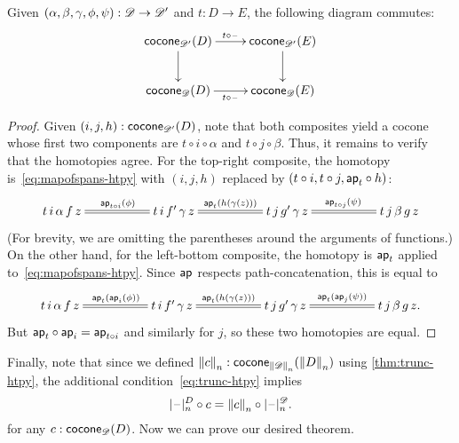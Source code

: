 \begin{lem}\label{thm:conemap-funct}
  Given $(\alpha,\beta,\gamma,\phi,\psi):\Ddiag \to \Ddiag'$ and $t:D\to E$, the following diagram commutes:
  \begin{equation*}
    \vcenter{\xymatrix{
        \cocone{\Ddiag'}{D}\ar[r]^{t \circ {\blank}}\ar[d] &
        \cocone{\Ddiag'}{E}\ar[d]\\
        \cocone{\Ddiag}{D}\ar[r]_{t \circ {\blank}} &
        \cocone{\Ddiag}{E}
      }}
  \end{equation*}
\end{lem}
\begin{proof}
  Given $(i,j,h):\cocone{\Ddiag'}{D}$, note that both composites yield a cocone whose first two components are $t\circ i\circ \alpha$ and $t\circ j\circ\beta$.
  Thus, it remains to verify that the homotopies agree.
  For the top-right composite, the homotopy is~\eqref{eq:mapofspans-htpy} with $(i,j,h)$ replaced by $(t\circ i, t\circ j, \apfunc{t}\circ h)$:
  \begin{equation*}
    \xymatrix@+2.8em{
      {t \, i \, \alpha \, f \, z} \ar@{=}[r]^{\apfunc{t\circ i}(\phi)} &
      {t \, i \, f' \, \gamma \, z} \ar@{=}[r]^{\apfunc{t}(h(\gamma(z)))} &
      {t \, j \, g' \, \gamma \, z} \ar@{=}[r]^{\apfunc{t\circ j}(\psi)} &
      {t \, j \, \beta \, g \, z}
    }
  \end{equation*}
  (For brevity, we are omitting the parentheses around the arguments of functions.)
  On the other hand, for the left-bottom composite, the homotopy is $\apfunc{t}$ applied to~\eqref{eq:mapofspans-htpy}.
  Since $\apfunc{}$ respects path-concatenation, this is equal to
  \begin{equation*}
    \xymatrix@+2.8em{
      {t \, i \, \alpha \, f \, z} \ar@{=}[r]^{\apfunc{t}(\apfunc{i}(\phi))} &
      {t \, i \, f' \, \gamma \, z} \ar@{=}[r]^{\apfunc{t}(h(\gamma(z)))} &
      {t \, j \, g' \, \gamma \, z} \ar@{=}[r]^{\apfunc{t}(\apfunc{j}(\psi))} &
      {t \, j \, \beta \, g \, z}. }
  \end{equation*}
  But $\apfunc{t}\circ \apfunc{i} = \apfunc{t\circ i}$ and similarly for $j$, so these two homotopies are equal.
\end{proof}

Finally, note that since we defined $\trunc nc : \cocone{\trunc n \Ddiag}{\trunc n D}$ using \autoref{thm:trunc-htpy}, the additional condition~\eqref{eq:trunc-htpy} implies
\begin{equation}
  \tprojf[D] n \circ c = \trunc n c \circ \tprojf[\Ddiag]n. \label{eq:conetrunc}
\end{equation}
for any $c:\cocone{\Ddiag}{D}$.
Now we can prove our desired theorem.

